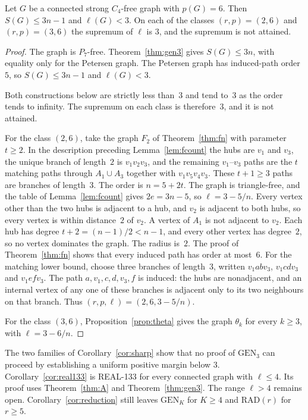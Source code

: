 \documentclass[ASNA]{USG}
\theoremstyle{WBstyletwo}
\numberwithin{equation}{section}
\newcommand{\lr}{\ell}
\newcommand{\pp}{p}
\newcommand{\GEN}{\mathrm{GEN}}
\newcommand{\RAD}{\mathrm{RAD}}
\begin{document}
\begin{corollary}\label{cor:sharp}
Let $G$ be a connected strong $C_4$-free graph with $\pp(G)=6$. Then $S(G)\le 3n-1$ and $\lr(G)<3$. On each of the classes $(r,\pp)=(2,6)$ and $(r,\pp)=(3,6)$ the supremum of $\lr$ is $3$, and the supremum is not attained.
\end{corollary}

\begin{proof}
The graph is $P_7$-free. Theorem~\ref{thm:gen3} gives $S(G)\le 3n$, with equality only for the Petersen graph. The Petersen graph has induced-path order~$5$, so $S(G)\le 3n-1$ and $\lr(G)<3$.

Both constructions below are strictly less than~$3$ and tend to~$3$ as the order tends to infinity. The supremum on each class is therefore~$3$, and it is not attained.

For the class $(2,6)$, take the graph $F_2$ of Theorem~\ref{thm:fn} with parameter $t\ge 2$. In the description preceding Lemma~\ref{lem:fcount} the hubs are $v_1$ and $v_3$, the unique branch of length~$2$ is $v_1v_2v_3$, and the remaining $v_1$--$v_3$ paths are the $t$ matching paths through $A_1\cup A_3$ together with $v_1v_5v_4v_3$. These $t+1\ge 3$ paths are branches of length~$3$. The order is $n=5+2t$. The graph is triangle-free, and the table of Lemma~\ref{lem:fcount} gives $2e=3n-5$, so $\lr=3-5/n$. Every vertex other than the two hubs is adjacent to a hub, and $v_2$ is adjacent to both hubs, so every vertex is within distance~$2$ of $v_2$. A vertex of $A_1$ is not adjacent to $v_2$. Each hub has degree $t+2=(n-1)/2<n-1$, and every other vertex has degree~$2$, so no vertex dominates the graph. The radius is~$2$. The proof of Theorem~\ref{thm:fn} shows that every induced path has order at most~$6$. For the matching lower bound, choose three branches of length~$3$, written $v_1abv_3$, $v_1cdv_3$ and $v_1efv_3$. The path $a,v_1,c,d,v_3,f$ is induced: the hubs are nonadjacent, and an internal vertex of any one of these branches is adjacent only to its two neighbours on that branch. Thus $(r,\pp,\lr)=(2,6,3-5/n)$.

For the class $(3,6)$, Proposition~\ref{prop:theta} gives the graph $\theta_k$ for every $k\ge 3$, with $\lr=3-6/n$.
\end{proof}

The two families of Corollary~\ref{cor:sharp} show that no proof of $\GEN_3$ can proceed by establishing a uniform positive margin below $3$. Corollary~\ref{cor:real133} is REAL-133 for every connected graph with $\lr\le 4$. Its proof uses Theorem~\ref{thm:A} and Theorem~\ref{thm:gen3}. The range $\lr>4$ remains open. Corollary~\ref{cor:reduction} still leaves $\GEN_K$ for $K\ge 4$ and $\RAD(r)$ for $r\ge 5$.
\end{document}
